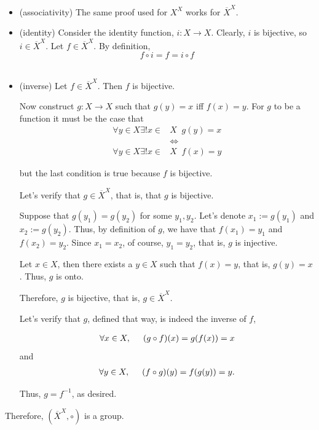 \documentclass{article}
\begin{document}
\begin{itemize}
    \item (associativity) The same proof used for $X^X$ works for $\overline{X}^X$.\\
    \item (identity) Consider the identity function, $i:X \rightarrow X$. Clearly, $i $ is bijective, so $i \in \overline{X}^X$. Let $f \in \overline{X}^X$. By definition, 
    $$f\circ i=f=i \circ f$$\\
    \item(inverse) Let $f \in \overline{X}^X$. Then $f $ is bijective.
    
    Now construct $g: X \rightarrow X$ such that $g(y)=x$ iff $f(x)=y$. For $g$ to be a function it must be the case that 
    \begin{align*}
        \forall y \in X \exists !x \in &X \;\;g(y)=x\\
        &\Leftrightarrow\\
        \forall y \in X \exists !x \in &X \;\;f(x)=y
    \end{align*}

but the last condition is true because $f$ is bijective.

Let's verify that $g \in \overline{X}^X$, that is, that $g$ is bijective. 

Suppose that $g(y_1)=g(y_2)$ for some $y_1,y_2$. Let's denote $x_1:=g(y_1)$ and $x_2:=g(y_2)$. Thus, by definition of $g$, we have that $f(x_1)=y_1$ and $f(x_2)=y_2$. Since $x_1=x_2$, of course, $y_1=y_2$, that is, $g$ is injective.

Let $x \in X$, then there exists a $y \in X$ such that $f(x)=y$, that is, $g(y)=x$. Thus, $g$ is onto.

Therefore, $g $ is bijective, that is, $g \in \overline{X}^X$.

Let's verify that $g$, defined that way, is indeed the inverse of $f$,

\begin{align*}
   \forall x \in X, \hspace{0.5cm} (g \circ f)(x)=g(f(x))=x
\end{align*}
and
\begin{align*}
    \forall y \in X, \hspace{0.5cm}(f \circ g)(y)=f(g(y))=y.
\end{align*}

Thus, $g=f^{-1}$, as desired.
\end{itemize}

Therefore, $(\overline{X}^X, \circ)$ is a group.
\end{document}
